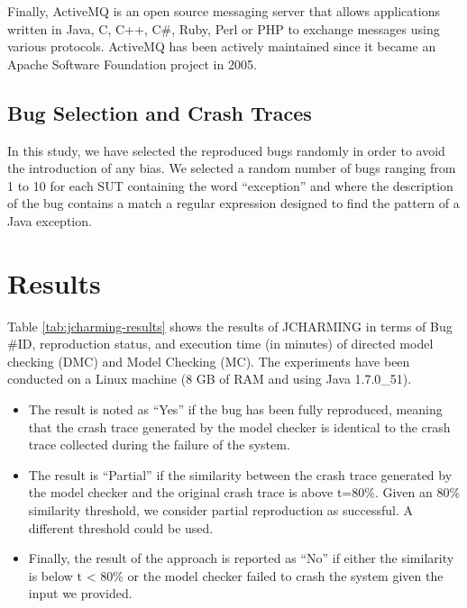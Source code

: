 \documentclass[times]{smrauth}
\begin{document}
Finally, ActiveMQ \cite{snyder2011activemq} is an open source messaging server that allows applications written in Java, C, C++, C\#, Ruby, Perl or PHP to exchange messages using various protocols. ActiveMQ has  been actively maintained since it became an Apache Software Foundation project in 2005.


\subsection{Bug Selection and Crash Traces}

In this study, we have selected the reproduced bugs randomly
in order to avoid the introduction of any bias. We selected a
random number of bugs ranging from 1 to 10 for each SUT containing the word ``exception'' and where the description of
the bug contains a match a regular expression designed to find the pattern of a
Java exception.

\section{Results\label{sec:results}}

Table \ref{tab:jcharming-results} shows the results of JCHARMING in terms of Bug
\#ID, reproduction status, and execution time (in minutes) of
directed model checking (DMC) and Model Checking (MC).
The experiments have been conducted on a Linux machine (8
GB of RAM and using Java 1.7.0\_51).

\begin{itemize}
  \item The result is noted as ``Yes'' if the bug has been fully
reproduced, meaning that the crash trace generated by the
model checker is identical to the crash trace collected
during the failure of the system.
\item The result is ``Partial'' if the similarity between the crash
trace generated by the model checker and the original
crash trace is above t=80\%. Given an 80\% similarity
threshold, we consider partial reproduction as successful.
A different threshold could be used.
\item Finally, the result of the approach is reported as ``No'' if
either the similarity is below t < 80\% or the model
checker failed to crash the system given the input we
provided.
\end{itemize}
\end{document}
